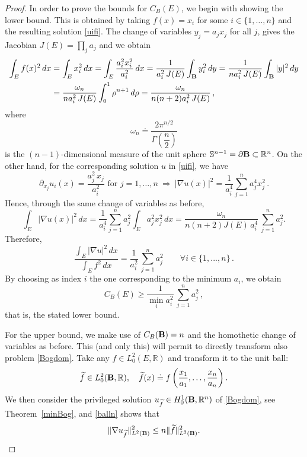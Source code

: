 \documentclass[11pt]{article}
\theoremstyle{plain}
\theoremstyle{definition}
\numberwithin{equation}{section}
\newcommand{\R}{\mathbb{R}}
\newcommand{\B}{{\bf B}}
\begin{document}
\begin{proof}
	In order to prove the bounds for $C_B(E)$, we begin with showing the lower bound. This is obtained by taking $f(x)=x_i$ for some $i\in\{1,\ldots,n\}$ and the resulting solution
	\eqref{uifi}. The change of variables $y_j=a_jx_j$ for all $j$, gives the Jacobian $J(E)=\prod_ja_j$ and we obtain
	\begin{align*}
		\int_Ef(x)^2\, dx &= \int_Ex_i^2\, dx=\int_E\frac{a_i^2x_i^2}{a_i^2}\, dx=\frac{1}{a_i^2\, J(E)}\int_\B y_i^2\, dy=
		\frac{1}{na_i^2\, J(E)}\int_\B|y|^2\, dy\\
		&= \frac{\omega_n }{na_i^2\, J(E)}\int_0^1\rho^{n+1}\, d\rho=\frac{\omega_n }{n(n+2)a_i^2\, J(E)}\, ,
	\end{align*}
		where
	$$
	\omega_n  \doteq \dfrac{2 \pi^{n/2}}{\Gamma \left( \dfrac{n}{2} \right)}
	$$
	is the $(n-1)$-dimensional measure of the  unit sphere $\mathbb{S}^{n-1}=\partial \B \subset \R^n$. 
	On the other hand, for the corresponding solution $u$ in \eqref{uifi}, we have
	$$
	\partial_{x_j}u_i(x)=\frac{a_j^2\, x_j}{a_i^2}\mbox{ for }j=1,\ldots,n\ \Longrightarrow\ |\nabla u(x)|^2=
	\frac{1}{a_i^4}\sum_{j=1}^{n}a_j^4x_j^2\, .
	$$
	Hence, through the same change of variables as before,
	$$
	\int_E|\nabla u(x)|^2\, dx =\frac{1}{a_i^4}\sum_{j=1}^{n}a_j^2\int_Ea_j^2x_j^2\, dx
	= \frac{\omega_n }{n(n+2)J(E)\, a_i^4}\, \sum_{j=1}^{n}a_j^2.
	$$
	Therefore,
	\begin{equation}\label{bogratioaffine}
\frac{\int_E|\nabla u|^2\, dx}{\int_E f^2\, dx}=\frac{1}{a_i^2}\, \sum_{j=1}^{n}a_j^2\qquad\forall i \in \{1,...,n\}\, .	
	\end{equation}
	By choosing as index $i$ the one corresponding to the minimum $a_i$, we obtain
	\begin{equation}\label{eq:ellipse_2}
	C_B(E)\ge\frac{1}{\min_ia_i^2}\, \sum_{j=1}^{n}a_j^2\, ,
	\end{equation}
	that is, the stated lower bound.\par
For the upper bound, we make use of $C_B(\B)=n$ and the homothetic change of variables as before. This (and only this) will permit to directly transform also problem \eqref{Bogdom}.
	Take any
	$f\in L^2_0 (E,\R)$ and transform it to the unit ball:
	$$
	\widetilde f\in L^2_0 (\B,\R), \quad \widetilde f(x)\doteq f\left( \frac{x_1}{a_1},\ldots,\frac{x_n}{a_n}\right).
	$$
	We then consider the privileged solution $u_{\widetilde f}\in H^1_0(\B,\R^n)$
	of \eqref{Bogdom}, see Theorem~\ref{minBog}, and \eqref{balln} shows that
	\begin{equation}\label{eq:ellipse_1}
	\| \nabla u_{\widetilde f} \|^2_{L^2(\B)}\le n \| {\widetilde f} \|^2_{L^2(\B)}.

\end{equation}
\end{proof}
\end{document}
